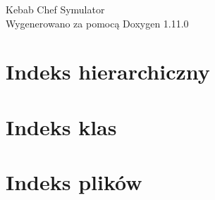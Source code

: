 \documentclass[twoside]{book}
\newcommand{\+}{\discretionary{\mbox{\scriptsize$\hookleftarrow$}}{}{}}
\newcommand{\clearemptydoublepage}{%
    \newpage{\pagestyle{empty}\cleardoublepage}%
  }
\begin{document}
  \raggedbottom
    \hypersetup{pageanchor=false,
                bookmarksnumbered=true,
                pdfencoding=unicode
               }
  \begin{titlepage}
  \vspace*{7cm}
  \begin{center}%
  {\Large Kebab Chef Symulator}\\
  \vspace*{1cm}
  {\large Wygenerowano za pomocą Doxygen 1.11.0}\\
  \end{center}
  \end{titlepage}
  \clearemptydoublepage
  \tableofcontents
  \clearemptydoublepage
  \hypersetup{pageanchor=true}
\chapter{Indeks hierarchiczny}

\chapter{Indeks klas}

\chapter{Indeks plików}

\end{document}
